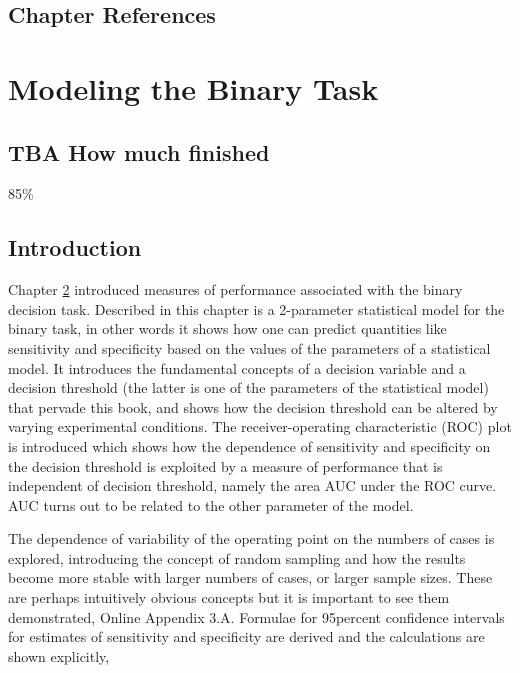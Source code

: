 \documentclass[
]{book}
\begin{document}
\hypertarget{binary-task-references}{%
\section{Chapter References}\label{binary-task-references}}

\hypertarget{binary-task-model}{%
\chapter{Modeling the Binary Task}\label{binary-task-model}}

\hypertarget{binary-task-model-how-much-finished}{%
\section{TBA How much finished}\label{binary-task-model-how-much-finished}}

85\%

\hypertarget{binary-task-model-intro}{%
\section{Introduction}\label{binary-task-model-intro}}

Chapter \ref{binary-task-model} introduced measures of performance associated with the binary decision task. Described in this chapter is a 2-parameter statistical model for the binary task, in other words it shows how one can predict quantities like sensitivity and specificity based on the values of the parameters of a statistical model. It introduces the fundamental concepts of a decision variable and a decision threshold (the latter is one of the parameters of the statistical model) that pervade this book, and shows how the decision threshold can be altered by varying experimental conditions. The receiver-operating characteristic (ROC) plot is introduced which shows how the dependence of sensitivity and specificity on the decision threshold is exploited by a measure of performance that is independent of decision threshold, namely the area AUC under the ROC curve. AUC turns out to be related to the other parameter of the model.

The dependence of variability of the operating point on the numbers of cases is explored, introducing the concept of random sampling and how the results become more stable with larger numbers of cases, or larger sample sizes. These are perhaps intuitively obvious concepts but it is important to see them demonstrated, Online Appendix 3.A. Formulae for 95percent confidence intervals for estimates of sensitivity and specificity are derived and the calculations are shown explicitly,
\end{document}
